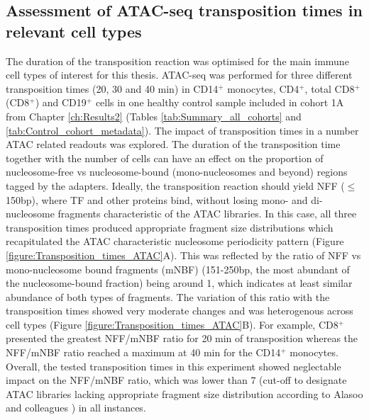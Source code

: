 \bigskip %



\subsection{Assessment of ATAC-seq transposition times in relevant cell types}
\label{ATACseq}

The duration of the transposition reaction was optimised for the main immune cell types of interest for this thesis. ATAC-seq was performed for three different transposition times (20, 30 and 40 min) in CD14$^+$ monocytes, CD4$^+$, total CD8$^+$ (CD8$^+$) and CD19$^+$ cells in one healthy control sample included in cohort 1A from Chapter \ref{ch:Results2} (Tables \ref{tab:Summary_all_cohorts} and \ref{tab:Control_cohort_metadata}). The impact of transposition times in a number ATAC related readouts was explored. The duration of the transposition time together with the number of cells can have an effect on the proportion of nucleosome-free vs nucleosome-bound (mono-nucleosomes and beyond) regions tagged by the adapters. Ideally, the transposition reaction should yield NFF ($\leq$150bp), where TF and other proteins bind, without losing mono- and di-nucleosome fragments characteristic of the ATAC libraries. In this case, all three transposition times produced appropriate fragment size distributions which recapitulated the ATAC characteristic nucleosome periodicity pattern (Figure \ref{figure:Transposition_times_ATAC}A). This was reflected by the ratio of NFF vs mono-nucleosome bound fragments (mNBF) (151-250bp, the most abundant of the nucleosome-bound fraction) being around 1, which indicates at least similar abundance of both types of fragments. The variation of this ratio with the transposition times showed very moderate changes and was heterogenous across cell types (Figure \ref{figure:Transposition_times_ATAC}B). For example, CD8$^+$ presented the greatest NFF/mNBF ratio for 20 min of transposition whereas the NFF/mNBF ratio reached a maximum at 40 min for the CD14$^+$ monocytes. Overall, the tested transposition times in this experiment showed neglectable impact on the NFF/mNBF ratio, which was lower than 7 (cut-off to designate ATAC libraries lacking appropriate fragment size distribution according to Alasoo and colleagues \parencite{Alasoo2018}) in all instances. 

